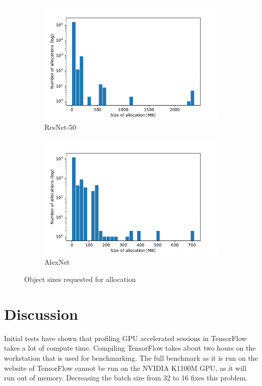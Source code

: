 \documentclass[12pt,twoside]{article}
\begin{document}
\begin{figure}[!ht]
  \centering
  \begin{subfigure}[b]{0.49\textwidth}
    \includegraphics[width=\textwidth]{../Quantitative_Python/ResNet-50_hist_MB_ylog.pdf}
    \caption{ResNet-50}
    \label{fig:hist_resnet}
  \end{subfigure}
  \begin{subfigure}[b]{0.49\textwidth}
    \includegraphics[width=\textwidth]{../Quantitative_Python/AlexNet_hist_MB_ylog.pdf}
    \caption{AlexNet}
    \label{fig:hist_resnet}
  \end{subfigure}
  \caption{Object sizes requested for allocation}
\end{figure}

\section{Discussion}
\label{sec:discussion}
Initial tests have shown that profiling GPU accelerated sessions in TensorFlow takes a lot of compute time. Compiling TensorFlow takes about two hours on the workstation that is used for benchmarking. The full benchmark as it is run on the website of TensorFlow cannot be run on the NVIDIA K1100M GPU, as it will run out of memory. Decreasing the batch size from 32 to 16 fixes this problem.
\end{document}
